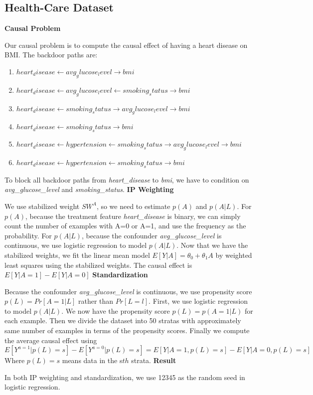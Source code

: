 \documentclass[letterpaper,12pt]{article}
\begin{document}
\subsection{Health-Care Dataset}
\textbf{Causal Problem}\par
Our causal problem is to compute the causal effect of having a heart disease on BMI. The backdoor paths are:
\begin{enumerate}
\item $heart_disease \leftarrow avg_glucose_level \rightarrow bmi $
\item $heart_disease \leftarrow avg_glucose_level \leftarrow smoking_status \rightarrow bmi $ 
\item $heart_disease \leftarrow smoking_status \rightarrow avg_glucose_level \rightarrow bmi $
\item $heart_disease \leftarrow smoking_status \rightarrow bmi $
\item $heart_disease \leftarrow hypertension \leftarrow smoking_status \rightarrow avg_glucose_level \rightarrow bmi $
\item $heart_disease \leftarrow hypertension \leftarrow smoking_status \rightarrow bmi $
\end{enumerate}
To block all backdoor paths from \emph{heart_disease} to \emph{bmi}, we have to condition on \emph{avg_glucose_level} and \emph{smoking_status}.
\textbf{IP Weighting}\par
We use stabilized weight $SW^{A}$, so we need to estimate $p(A)$ and $p(A|L)$.
For $p(A)$, because the treatment feature \emph{heart_disease} is binary, we can simply count the number of examples with A=0 or A=1, and use the frequency as the probability.
For $p(A|L)$, because the confounder \emph{avg_glucose_level} is continuous, we use logistic regression to model $p(A|L)$.
Now that we have the stabilized weights, we fit the linear mean model $E[Y|A]=\theta_{0}+\theta_{1}A$ by weighted least squares using the stabilized weights. The causal effect is $E[Y|A=1]-E[Y|A=0]$
\textbf{Standardization}\par
Because the confounder \emph{avg_glucose_level} is continuous, we use propensity score $p(L)=Pr[A=1|L]$ rather than $Pr[L=l]$.
First, we use logistic regression to model $p(A|L)$. We now have the propensity score $p(L)=p(A=1|L)$ for each example.
Then we divide the dataset into 50 stratas with approximately same number of examples in terms of the propensity scores.
Finally we compute the average causal effect using
$$E[Y^{a=1}|p(L)=s]-E[Y^{a=0}|p(L)=s]=E[Y|A=1,p(L)=s]-E[Y|A=0,p(L)=s]$$
Where $p(L)=s$ means data in the s$th$ strata.
\textbf{Result}\par
In both IP weighting and standardization, we use 12345 as the random seed in logistic regression.
\end{document}
